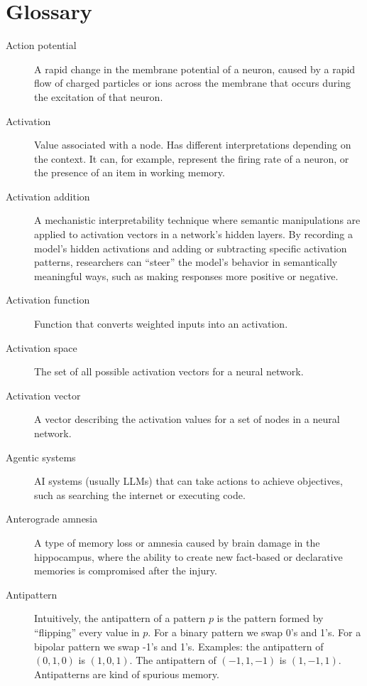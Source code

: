 \chapter{Glossary}

\begin{description}

\item[Action potential] A rapid change in the membrane potential of a neuron, caused by a rapid flow of charged particles or ions across the membrane that occurs during the excitation of that neuron.

\item[Activation] Value associated with a node. Has different interpretations depending on the context. It can, for example, represent the firing rate of a neuron, or the presence of an item in working memory.

\item[Activation addition] A mechanistic interpretability technique where semantic manipulations are applied to activation vectors in a network’s hidden layers. By recording a model's hidden activations and adding or subtracting specific activation patterns, researchers can “steer” the model's behavior in semantically meaningful ways, such as making responses more positive or negative.

\item[Activation function] Function that converts weighted inputs into an activation. 

\item[Activation space] The set of all possible activation vectors for a neural network.

\item[Activation vector] A vector describing the activation values for a set of nodes in a neural network.


\item[Agentic systems] AI systems (usually LLMs) that can take actions to achieve objectives, such as searching the internet or executing code. 

\item[Anterograde amnesia] A type of memory loss or amnesia caused by brain damage in the hippocampus, where the ability to create new fact-based or declarative memories is compromised after the injury. 

\item[Antipattern] Intuitively, the antipattern of a pattern $p$ is the pattern formed by ``flipping'' every value in $p$.  For a binary pattern we swap 0's and 1's. For a bipolar pattern we swap -1's and 1's. Examples: the antipattern of $(0,1,0)$ is  $(1,0,1)$. The antipattern of $(-1,1,-1)$ is  $(1,-1,1)$. Antipatterns are  kind of spurious memory.


\end{description}
